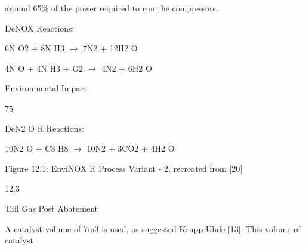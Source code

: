 \documentclass[a4paper,portrait,12pt]{article}
\begin{document}
\begin{flushleft}
around 65\% of the power required to run the compressors.
\end{flushleft}


\begin{flushleft}
DeNOX Reactions:
\end{flushleft}


\begin{flushleft}
6N O2 + 8N H3 $\rightarrow$ 7N2 + 12H2 O
\end{flushleft}


\begin{flushleft}
4N O + 4N H3 + O2 $\rightarrow$ 4N2 + 6H2 O
\end{flushleft}





\begin{flushleft}
\newpage
Environmental Impact
\end{flushleft}





75





\begin{flushleft}
DeN2 O R Reactions:
\end{flushleft}


\begin{flushleft}
10N2 O + C3 H8 $\rightarrow$ 10N2 + 3CO2 + 4H2 O
\end{flushleft}





\begin{flushleft}
Figure 12.1: EnviNOX R Process Variant - 2, recreated from [20]
\end{flushleft}





12.3





\begin{flushleft}
Tail Gas Post Abatement
\end{flushleft}





\begin{flushleft}
A catalyst volume of 7m3 is used, as suggested Krupp Uhde [13]. This volume of catalyst
\end{flushleft}
\end{document}

